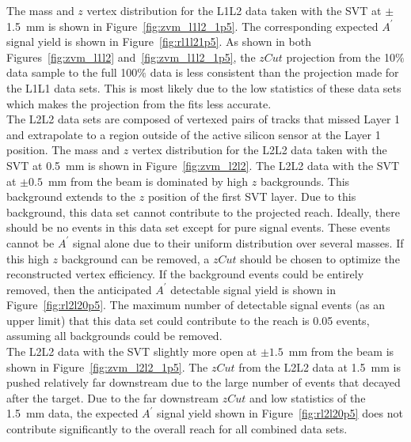 \indent The mass and $z$ vertex distribution for the L1L2 data taken with the SVT at $\pm$1.5~mm is shown in Figure~\ref{fig:zvm_l1l2_1p5}. The corresponding expected $A^{\prime}$ signal yield is shown in Figure~\ref{fig:rl1l21p5}. As shown in both Figures~\ref{fig:zvm_l1l2} and~\ref{fig:zvm_l1l2_1p5}, the $zCut$ projection from the 10$\%$ data sample to the full 100$\%$ data is less consistent than the projection made for the L1L1 data sets. This is most likely due to the low statistics of these data sets which makes the projection from the fits less accurate.\\ 
\indent The L2L2 data sets are composed of vertexed pairs of tracks that missed Layer 1 and extrapolate to a region outside of the active silicon sensor at the Layer 1 position. The mass and $z$ vertex distribution for the L2L2 data taken with the SVT at 0.5~mm is shown in Figure~\ref{fig:zvm_l2l2}. The L2L2 data with the SVT at $\pm0.5$~mm from the beam is dominated by high $z$ backgrounds. This background extends to the $z$ position of the first SVT layer. Due to this background, this data set cannot contribute to the projected reach. Ideally, there should be no events in this data set except for pure signal events. These events cannot be $A^{\prime}$ signal alone due to their uniform distribution over several masses. If this high $z$ background can be removed, a $zCut$ should be chosen to optimize the reconstructed vertex efficiency. If the background events could be entirely removed, then the anticipated $A^{\prime}$ detectable signal yield is shown in Figure~\ref{fig:rl2l20p5}. The maximum number of detectable signal events (as an upper limit) that this data set could contribute to the reach is 0.05 events, assuming all backgrounds could be removed.\\
\indent The L2L2 data with the SVT slightly more open at $\pm1.5$~mm from the beam is shown in Figure~\ref{fig:zvm_l2l2_1p5}. The $zCut$ from the L2L2 data at 1.5~mm is pushed relatively far downstream due to the large number of events that decayed after the target. Due to the far downstream $zCut$ and low statistics of the 1.5~mm data, the expected $A^{\prime}$ signal yield shown in Figure~\ref{fig:rl2l20p5} does not contribute significantly to the overall reach for all combined data sets. 

